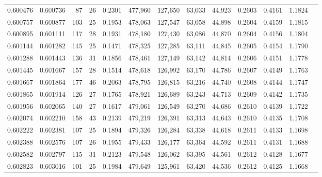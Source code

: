 \begin{tabular}{rrrrrrrrrrrrr}
0.600476 & 0.600736 &     87 &    26 &                                     0.2301 & 477,960 & 127,650 &  63,033 &  44,923 & 0.2603 & 0.4161 & 1.1824 \\
0.600757 & 0.600877 &    103 &    25 &                                     0.1953 & 478,063 & 127,547 &  63,058 &  44,898 & 0.2604 & 0.4159 & 1.1815 \\
0.600895 & 0.601111 &    117 &    28 &                                     0.1931 & 478,180 & 127,430 &  63,086 &  44,870 & 0.2604 & 0.4156 & 1.1804 \\
0.601144 & 0.601282 &    145 &    25 &                                     0.1471 & 478,325 & 127,285 &  63,111 &  44,845 & 0.2605 & 0.4154 & 1.1790 \\
0.601288 & 0.601443 &    136 &    31 &                                     0.1856 & 478,461 & 127,149 &  63,142 &  44,814 & 0.2606 & 0.4151 & 1.1778 \\
0.601445 & 0.601667 &    157 &    28 &                                     0.1514 & 478,618 & 126,992 &  63,170 &  44,786 & 0.2607 & 0.4149 & 1.1763 \\
0.601667 & 0.601864 &    177 &    46 &                                     0.2063 & 478,795 & 126,815 &  63,216 &  44,740 & 0.2608 & 0.4144 & 1.1747 \\
0.601865 & 0.601914 &    126 &    27 &                                     0.1765 & 478,921 & 126,689 &  63,243 &  44,713 & 0.2609 & 0.4142 & 1.1735 \\
0.601956 & 0.602065 &    140 &    27 &                                     0.1617 & 479,061 & 126,549 &  63,270 &  44,686 & 0.2610 & 0.4139 & 1.1722 \\
0.602074 & 0.602210 &    158 &    43 &                                     0.2139 & 479,219 & 126,391 &  63,313 &  44,643 & 0.2610 & 0.4135 & 1.1708 \\
0.602222 & 0.602381 &    107 &    25 &                                     0.1894 & 479,326 & 126,284 &  63,338 &  44,618 & 0.2611 & 0.4133 & 1.1698 \\
0.602388 & 0.602576 &    107 &    26 &                                     0.1955 & 479,433 & 126,177 &  63,364 &  44,592 & 0.2611 & 0.4131 & 1.1688 \\
0.602582 & 0.602797 &    115 &    31 &                                     0.2123 & 479,548 & 126,062 &  63,395 &  44,561 & 0.2612 & 0.4128 & 1.1677 \\
0.602823 & 0.603016 &    101 &    25 &                                     0.1984 & 479,649 & 125,961 &  63,420 &  44,536 & 0.2612 & 0.4125 & 1.1668 \\

\end{tabular}

